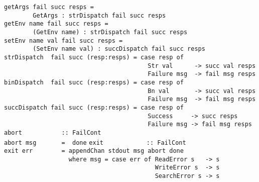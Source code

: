 \mbox{\tt getArgs\ fail\ succ\ resps\ =}\\
\mbox{\tt \ \ \ \ \ \ \ \ GetArgs\ :\ strDispatch\ fail\ succ\ resps}
\eprogB\noindent\bprogB
\mbox{\tt getEnv\ name\ fail\ succ\ resps\ =}\\
\mbox{\tt \ \ \ \ \ \ \ \ (GetEnv\ name)\ :\ strDispatch\ fail\ succ\ resps}
\eprogB\noindent\bprogB
\mbox{\tt setEnv\ name\ val\ fail\ succ\ resps\ =}\\
\mbox{\tt \ \ \ \ \ \ \ \ (SetEnv\ name\ val)\ :\ succDispatch\ fail\ succ\ resps}
\eprogB\noindent\bprogB
\mbox{\tt strDispatch\ \ fail\ succ\ (resp:resps)\ =\ case\ resp\ of\ }\\
\mbox{\tt \ \ \ \ \ \ \ \ \ \ \ \ \ \ \ \ \ \ \ \ \ \ \ \ \ \ \ \ \ \ \ \ \ \ \ \ \ \ \ \ Str\ val\ \ \ \ \ \ ->\ succ\ val\ resps}\\
\mbox{\tt \ \ \ \ \ \ \ \ \ \ \ \ \ \ \ \ \ \ \ \ \ \ \ \ \ \ \ \ \ \ \ \ \ \ \ \ \ \ \ \ Failure\ msg\ \ ->\ fail\ msg\ resps}
\eprogB\noindent\bprogB
\mbox{\tt binDispatch\ \ fail\ succ\ (resp:resps)\ =\ case\ resp\ of\ }\\
\mbox{\tt \ \ \ \ \ \ \ \ \ \ \ \ \ \ \ \ \ \ \ \ \ \ \ \ \ \ \ \ \ \ \ \ \ \ \ \ \ \ \ \ Bn\ val\ \ \ \ \ \ \ ->\ succ\ val\ resps}\\
\mbox{\tt \ \ \ \ \ \ \ \ \ \ \ \ \ \ \ \ \ \ \ \ \ \ \ \ \ \ \ \ \ \ \ \ \ \ \ \ \ \ \ \ Failure\ msg\ \ ->\ fail\ msg\ resps}
\eprogB\noindent\bprogB
\mbox{\tt succDispatch\ fail\ succ\ (resp:resps)\ =\ case\ resp\ of}\\
\mbox{\tt \ \ \ \ \ \ \ \ \ \ \ \ \ \ \ \ \ \ \ \ \ \ \ \ \ \ \ \ \ \ \ \ \ \ \ \ \ \ \ \ Success\ \ \ \ \ ->\ succ\ resps}\\
\mbox{\tt \ \ \ \ \ \ \ \ \ \ \ \ \ \ \ \ \ \ \ \ \ \ \ \ \ \ \ \ \ \ \ \ \ \ \ \ \ \ \ \ Failure\ msg\ ->\ fail\ msg\ resps}
\eprogB\noindent\bprogB
\mbox{\tt abort\ \ \ \ \ \ \ \ \ \ \ ::\ FailCont}\\
\mbox{\tt abort\ msg\ \ \ \ \ \ \ =\ \ done}
%
\eprogB\noindent\bprogB
\mbox{\tt exit\ \ \ \ \ \ \ \ \ \ \ \ ::\ FailCont}\\
\mbox{\tt exit\ err\ \ \ \ \ \ \ \ =\ appendChan\ stdout\ msg\ abort\ done}\\
\mbox{\tt \ \ \ \ \ \ \ \ \ \ \ \ \ \ \ \ \ \ where\ msg\ =\ case\ err\ of\ ReadError\ s\ \ \ ->\ s}\\
\mbox{\tt \ \ \ \ \ \ \ \ \ \ \ \ \ \ \ \ \ \ \ \ \ \ \ \ \ \ \ \ \ \ \ \ \ \ \ \ \ \ \ \ \ \ WriteError\ s\ \ ->\ s}\\
\mbox{\tt \ \ \ \ \ \ \ \ \ \ \ \ \ \ \ \ \ \ \ \ \ \ \ \ \ \ \ \ \ \ \ \ \ \ \ \ \ \ \ \ \ \ SearchError\ s\ ->\ s}\\
